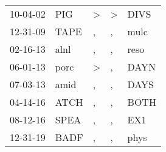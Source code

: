 \begin{supertabular}{lllll}
 10-04-02 &   PIG &  \textgreater &  \textgreater &  DIVS \\
 12-31-09 &  TAPE &             , &             , &  mulc \\
 02-16-13 &  alnl &             , &             , &  reso \\
 06-01-13 &  porc &  \textgreater &             , &  DAYN \\
 07-03-13 &  amid &             , &             , &  DAYS \\
 04-14-16 &  ATCH &             , &             , &  BOTH \\
 08-12-16 &  SPEA &             , &             , &   EX1 \\
 12-31-19 &  BADF &             , &             , &  phys \\
\end{supertabular}
